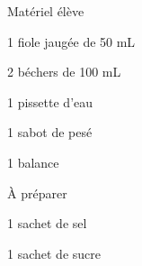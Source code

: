 
\begin{boiteMateriel}{Matériel élève}
  \effectifPremiereStss

  \begin{protocole}
    \item 1 fiole jaugée de 50 mL
    \item 2 béchers de 100 mL
    \item 1 pissette d'eau
    \item 1 sabot de pesé
    \item 1 balance
  \end{protocole}
\end{boiteMateriel}


\begin{boiteMateriel}{À préparer}
  \begin{protocole}
    \item 1 sachet de sel
    \item 1 sachet de sucre
  \end{protocole}
\end{boiteMateriel}
